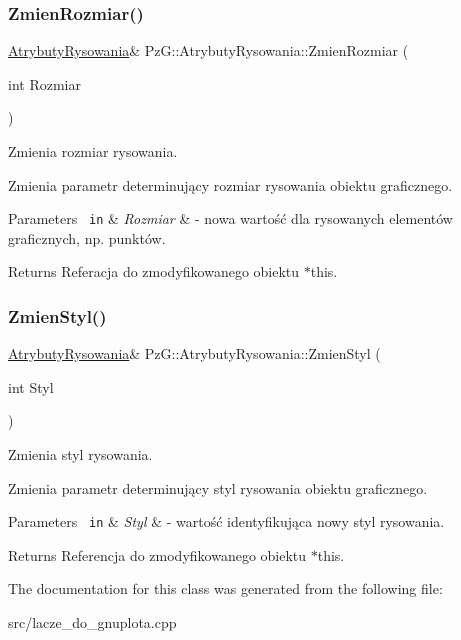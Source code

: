 \subsubsection{\texorpdfstring{ZmienRozmiar()}{ZmienRozmiar()}}
{\footnotesize\ttfamily \mbox{\hyperlink{class_pz_g_1_1_atrybuty_rysowania}{Atrybuty\+Rysowania}}\& Pz\+G\+::\+Atrybuty\+Rysowania\+::\+Zmien\+Rozmiar (\begin{DoxyParamCaption}\item[{int}]{Rozmiar }\end{DoxyParamCaption})\hspace{0.3cm}{\ttfamily [inline]}}



Zmienia rozmiar rysowania. 

Zmienia parametr determinujący rozmiar rysowania obiektu graficznego. 
\begin{DoxyParams}[1]{Parameters}
\mbox{\texttt{ in}}  & {\em Rozmiar} & -\/ nowa wartość dla rysowanych elementów graficznych, np. punktów. \\
\hline
\end{DoxyParams}
\begin{DoxyReturn}{Returns}
Referacja do zmodyfikowanego obiektu {\ttfamily $\ast$this}. 
\end{DoxyReturn}
\mbox{\label{class_pz_g_1_1_atrybuty_rysowania_a2ac97706124b14072715ecf3f07e82b4}} 
\subsubsection{\texorpdfstring{ZmienStyl()}{ZmienStyl()}}
{\footnotesize\ttfamily \mbox{\hyperlink{class_pz_g_1_1_atrybuty_rysowania}{Atrybuty\+Rysowania}}\& Pz\+G\+::\+Atrybuty\+Rysowania\+::\+Zmien\+Styl (\begin{DoxyParamCaption}\item[{int}]{Styl }\end{DoxyParamCaption})\hspace{0.3cm}{\ttfamily [inline]}}



Zmienia styl rysowania. 

Zmienia parametr determinujący styl rysowania obiektu graficznego. 
\begin{DoxyParams}[1]{Parameters}
\mbox{\texttt{ in}}  & {\em Styl} & -\/ wartość identyfikująca nowy styl rysowania. \\
\hline
\end{DoxyParams}
\begin{DoxyReturn}{Returns}
Referencja do zmodyfikowanego obiektu {\ttfamily $\ast$this}. 
\end{DoxyReturn}


The documentation for this class was generated from the following file\+:\begin{DoxyCompactItemize}
\item 
src/lacze\+\_\+do\+\_\+gnuplota.\+cpp\end{DoxyCompactItemize}
